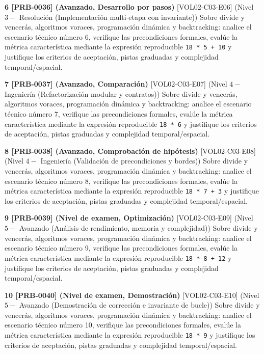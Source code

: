 \documentclass{book}
\begin{document}
\begin{tcolorbox}[title={Ejercicios}, studiumworked, breakable]
\noindent\textbf{6 [PRB-0036] (Avanzado, Desarrollo por pasos)}
[VOL02-C03-E06] (Nivel \(3 -\) Resolución (Implementación multi-etapa con invariante)) Sobre divide y vencerás, algoritmos voraces, programación dinámica y backtracking: analice el escenario técnico número 6, verifique las precondiciones formales, evalúe la métrica característica mediante la expresión reproducible \texttt{18 * 5 + 10} y justifique los criterios de aceptación, pistas graduadas y complejidad temporal/espacial.

\noindent\textbf{7 [PRB-0037] (Avanzado, Comparación)}
[VOL02-C03-E07] (Nivel \(4 -\) Ingeniería (Refactorización modular y contratos)) Sobre divide y vencerás, algoritmos voraces, programación dinámica y backtracking: analice el escenario técnico número 7, verifique las precondiciones formales, evalúe la métrica característica mediante la expresión reproducible \texttt{18 * 6} y justifique los criterios de aceptación, pistas graduadas y complejidad temporal/espacial.

\noindent\textbf{8 [PRB-0038] (Avanzado, Comprobación de hipótesis)}
[VOL02-C03-E08] (Nivel \(4 -\) Ingeniería (Validación de precondiciones y bordes)) Sobre divide y vencerás, algoritmos voraces, programación dinámica y backtracking: analice el escenario técnico número 8, verifique las precondiciones formales, evalúe la métrica característica mediante la expresión reproducible \texttt{18 * 7 + 3} y justifique los criterios de aceptación, pistas graduadas y complejidad temporal/espacial.

\noindent\textbf{9 [PRB-0039] (Nivel de examen, Optimización)}
[VOL02-C03-E09] (Nivel \(5 -\) Avanzado (Análisis de rendimiento, memoria y complejidad)) Sobre divide y vencerás, algoritmos voraces, programación dinámica y backtracking: analice el escenario técnico número 9, verifique las precondiciones formales, evalúe la métrica característica mediante la expresión reproducible \texttt{18 * 8 + 12} y justifique los criterios de aceptación, pistas graduadas y complejidad temporal/espacial.

\noindent\textbf{10 [PRB-0040] (Nivel de examen, Demostración)}
[VOL02-C03-E10] (Nivel \(5 -\) Avanzado (Demostración de corrección e invariante de bucle)) Sobre divide y vencerás, algoritmos voraces, programación dinámica y backtracking: analice el escenario técnico número 10, verifique las precondiciones formales, evalúe la métrica característica mediante la expresión reproducible \texttt{18 * 9} y justifique los criterios de aceptación, pistas graduadas y complejidad temporal/espacial.


\end{tcolorbox}
\end{document}

